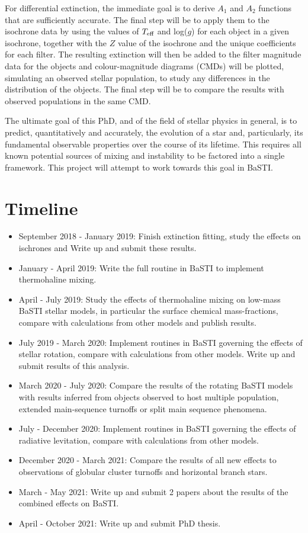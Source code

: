 \documentclass[12pt, a4paper]{report}
\begin{document}
For differential extinction, the immediate goal is to derive $A_{1}$ and $A_{2}$ functions that are  sufficiently accurate. The final step will be to apply them to the isochrone data by using the values of $T_{\textnormal{eff}}$ and log($g$) for each object in a given isochrone, together with the $Z$ value of the isochrone and the unique coefficients for each filter. The resulting extinction will then be added to the filter magnitude data for the objects and colour-magnitude diagrams (CMDs) will be plotted, simulating an observed stellar population, to study any differences in the distribution of the objects. The final step will be to compare the results with observed populations in the same CMD.

The ultimate goal of this PhD, and of the field of stellar physics in general, is to predict, quantitatively and accurately, the evolution of a star and, particularly, its fundamental observable properties over the course of its lifetime. This requires all known potential sources of mixing and instability to be factored into a single framework. This project will attempt to work towards this goal in BaSTI.

\section{Timeline}
\begin{itemize}
\item September 2018 - January 2019: Finish extinction fitting, study the effects on ischrones and Write up and submit these results.
\item January - April 2019: Write the full routine in BaSTI to implement thermohaline mixing.
\item April - July 2019: Study the effects of thermohaline mixing on low-mass BaSTI stellar models, in particular the surface chemical mass-fractions, compare with calculations from other models and publish results.
\item July 2019 - March 2020: Implement routines in BaSTI governing the effects of stellar rotation, compare with calculations from other models. Write up and submit results of this analysis.
\item March 2020 - July 2020: Compare the results of the rotating BaSTI models with results inferred from objects observed to host multiple population, extended main-sequence turnoffs or split main sequence phenomena.
\item July - December 2020: Implement routines in BaSTI governing the effects of radiative levitation, compare with calculations from other models.
\item December 2020 - March 2021: Compare the results of all new effects to observations of globular cluster turnoffs and horizontal branch stars.
\item March - May 2021: Write up and submit 2 papers about the results of the combined effects on BaSTI.
\item April - October 2021: Write up and submit PhD thesis.
\end{itemize}


\end{document}

